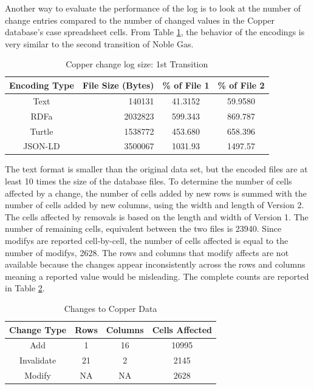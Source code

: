 Another way to evaluate the performance of the \gls{log} is to look at the number of \gls{change} entries compared to the number of changed values in the Copper database's case spreadsheet cells.
From Table \ref{table:Cu_changelog_table1}, the behavior of the encodings is very similar to the second transition of Noble Gas.
\begin{table}
	\caption{Copper change log size: 1st Transition}
	\label{table:Cu_changelog_table1}
	\centering
	\begin{tabular}{|c|r|c|c|}
		\hline
		Encoding Type & File Size (Bytes) & \% of File 1 & \% of File 2 \\
		\hline
		Text&	140131&	41.3152&	59.9580\\
		RDFa&	2032823&	599.343&	869.787\\
		Turtle&	1538772&	453.680&	658.396\\
		JSON-LD&	3500067&	1031.93&	1497.57\\
		\hline
	\end{tabular}
\end{table}
The text format is smaller than the original data set, but the encoded files are at least 10 times the size of the database files.
To determine the number of cells affected by a \gls{change}, the number of cells added by new rows is summed with the number of cells added by new columns, using the width and length of Version 2.
The cells affected by removals is based on the length and width of Version 1.
The number of remaining cells, equivalent between the two files is 23940.
Since \glspl{modify} are reported cell-by-cell, the number of cells affected is equal to the number of \glspl{modify}, 2628.
The rows and columns that \gls{modify} affects are not available because the \glspl{change} appear inconsistently across the rows and columns meaning a reported value would be misleading.
The complete counts are reported in Table \ref{table:Cu_cells}.
\begin{table}
	\caption{Changes to Copper Data}
	\label{table:Cu_cells}
	\centering
	\begin{tabular}{|c|c|c|c|}
		\hline
		Change Type&	Rows&	Columns&	Cells Affected\\ \hline
		Add&	1&	16&	10995\\
		Invalidate&	21&	2&	2145\\
		Modify&NA&NA& 2628\\
		\hline
	\end{tabular}
\end{table}

